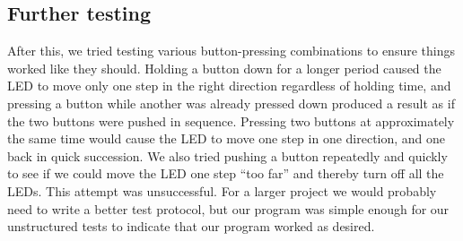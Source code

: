 \subsection{Further testing}
After this, we tried testing various button-pressing combinations to ensure things worked like they should. Holding a button down for a longer period caused the LED to move only one step in the right direction regardless of holding time, and pressing a button while another was already pressed down produced a result as if the two buttons were pushed in sequence. Pressing two buttons at approximately the same time would cause the LED to move one step in one direction, and one back in quick succession. We also tried pushing a button repeatedly and quickly to see if we could move the LED one step ``too far'' and thereby turn off all the LEDs. This attempt was unsuccessful. For a larger project we would probably need to write a better test protocol, but our program was simple enough for our unstructured tests to indicate that our program worked as desired.


